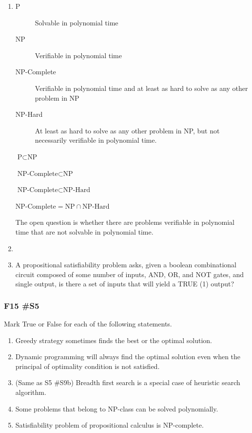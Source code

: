 \begin{enumerate}
	\item 
	
\begin{description}
	\item [P] Solvable in polynomial time
	\item [NP] Verifiable in polynomial time
	\item [NP-Complete] Verifiable in polynomial time and at least as hard to solve as any other problem in NP
	\item [NP-Hard] At least as hard to solve as any other problem in NP, but not necessarily verifiable in polynomial time.  
\end{description}	

	$\text{P} \subset \text{NP}$
	
	$\text{NP-Complete} \subset \text{NP}$

	$\text{NP-Complete} \subset \text{NP-Hard}$
	
	$\text{NP-Complete} = \text{NP} \cap \text{NP-Hard}$
	
	The open question is whether there are problems verifiable in polynomial time that are not solvable in polynomial time.  

	\item \


	\item A propositional satisfiability problem asks, given a boolean combinational circuit composed of some number of inputs, AND, OR, and NOT gates, and single output, is there a set of inputs that will yield a TRUE (1) output? 

\end{enumerate}

\subsubsection{F15 \#S5}
Mark True or False for each of the following statements.  
\begin{enumerate}[label=\alph*.]
		\item Greedy strategy sometimes finds the best or the optimal solution.
		\item Dynamic programming will always find the optimal solution even when the principal of optimality condition is not satisfied.
		\item (Same as S5 \#S9b) Breadth first search is a special case of heuristic search algorithm.
		\item Some problems that belong to NP-class can be solved polynomially.  
		\item Satisfiability problem of propositional calculus is NP-complete.
\end{enumerate}

